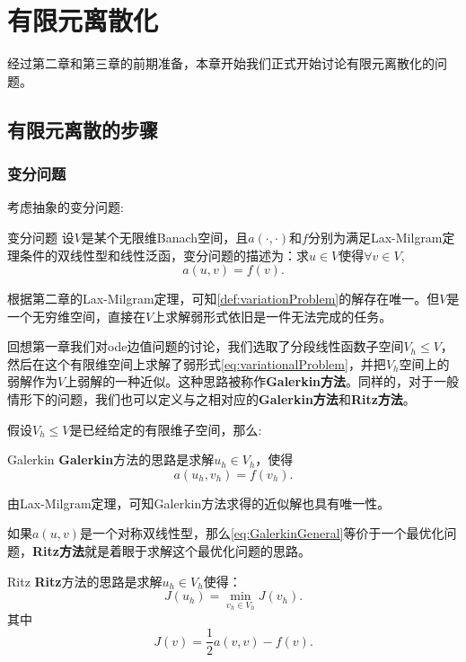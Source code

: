\chapter{有限元离散化}
经过第二章和第三章的前期准备，本章开始我们正式开始讨论有限元离散化的问题。
\section{有限元离散的步骤}
\subsection{变分问题}
考虑抽象的变分问题:
\begin{definition}{变分问题}
    \label{def:variationProblem}
设$V$是某个无限维Banach空间，且$a(\cdot,\cdot)$和$f$分别为满足Lax-Milgram定理条件的双线性型和线性泛函，变分问题的描述为：求$u\in V$使得$\forall v\in V$,
\begin{equation}
    \label{eq:variationalProblem}
    a(u,v)=f(v).
\end{equation}
\end{definition}
根据第二章的Lax-Milgram定理，可知\ref{def:variationProblem}的解存在唯一。但$V$是一个无穷维空间，直接在$V$上求解弱形式依旧是一件无法完成的任务。

回想第一章我们对ode边值问题的讨论，我们选取了分段线性函数子空间$V_{h}\le V$，然后在这个有限维空间上求解了弱形式\eqref{eq:variationalProblem}，并把$V_{h}$空间上的弱解作为$V$上弱解的一种近似。这种思路被称作\textbf{Galerkin方法}。同样的，对于一般情形下的问题，我们也可以定义与之相对应的\textbf{Galerkin方法}和\textbf{Ritz方法}。

假设$V_{h}\le V$是已经给定的有限维子空间，那么:
\begin{definition}{Galerkin}
    \textbf{Galerkin}方法的思路是求解$u_{h}\in V_{h}$，使得
    \begin{equation}
        \label{eq:GalerkinGeneral}
        a(u_{h},v_{h})=f(v_{h}).
    \end{equation}
\end{definition}
由Lax-Milgram定理，可知Galerkin方法求得的近似解也具有唯一性。

如果$a(u,v)$是一个对称双线性型，那么\eqref{eq:GalerkinGeneral}等价于一个最优化问题，\textbf{Ritz方法}就是着眼于求解这个最优化问题的思路。

\begin{definition}{Ritz}
    \textbf{Ritz}方法的思路是求解$u_{h}\in V_{h}$使得：
    \begin{equation}
        \label{eq:FunctionalMinimize}
        J(u_{h})=\min_{v_{h}\in V_{h}}J(v_{h}).
    \end{equation}
    其中
    \begin{equation}
        \label{eq:DefOfJ}
        J(v)=\frac{1}{2}a(v,v)-f(v).
    \end{equation}
\end{definition}

